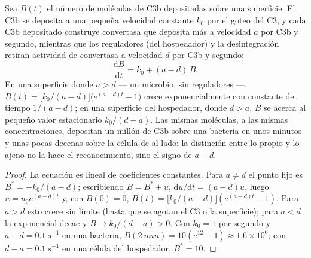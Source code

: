 \begin{theorem}\label{thm:b3:innate-immunity:complement}
Sea $B(t)$ el número de moléculas de C3b depositadas sobre una
superficie. El C3b se deposita a una pequeña velocidad constante $k_{0}$
por el goteo del C3, y cada C3b depositado construye convertasa que
deposita más a velocidad $a$ por C3b y segundo, mientras que los
reguladores (del hospedador) y la desintegración retiran actividad de
convertasa a velocidad $d$ por C3b y segundo:
\[
\frac{\mathrm{d}B}{\mathrm{d}t} = k_{0} + (a - d)\,B .
\]
En una superficie donde $a > d$ --- un microbio, sin reguladores ---,
$B(t) = \bigl[k_{0}/(a-d)\bigr]\bigl(e^{(a-d)t} - 1\bigr)$ crece
exponencialmente con constante de tiempo $1/(a - d)$; en una superficie
del hospedador, donde $d > a$, $B$ se acerca al pequeño valor
estacionario $k_{0}/(d - a)$. Las mismas moléculas, a las mismas
concentraciones, depositan un millón de C3b sobre una bacteria en unos
minutos y unas pocas decenas sobre la célula de al lado: la distinción
entre lo propio y lo ajeno no la hace el reconocimiento, sino el signo de
$a - d$.
\end{theorem}
\begin{proof}
La ecuación es lineal de coeficientes constantes. Para $a \ne d$ el punto
fijo es $B^{*} = -k_{0}/(a-d)$; escribiendo $B = B^{*} + u$,
$\mathrm{d}u/\mathrm{d}t = (a-d)u$, luego $u = u_{0}e^{(a-d)t}$ y, con
$B(0) = 0$, $B(t) = \bigl[k_{0}/(a-d)\bigr](e^{(a-d)t} - 1)$. Para
$a > d$ esto crece sin límite (hasta que se agotan el C3 o la
superficie); para $a < d$ la exponencial decae y $B \to k_{0}/(d-a) > 0$.
Con $k_{0} = 1$ por segundo y $a - d = \qty{0.1}{s^{-1}}$ en una
bacteria, $B(\qty{2}{min})
= 10(e^{12} - 1) \approx 1.6\times 10^{6}$; con $d - a =
\qty{0.1}{s^{-1}}$ en una célula del hospedador, $B^{*} = 10$.
\end{proof}

